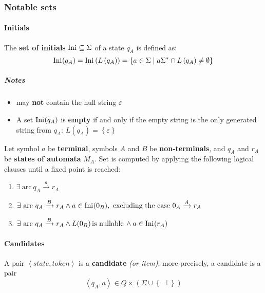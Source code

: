 \documentclass[english]{article}
\begin{document}
\subsubsection{Notable sets}

\paragraph{Initials}

\begin{definition}
  The \textbf{set of initials} \(\text{Ini}\hspace{0.1ex} \subseteq \Sigma\) of a state \(q_A\) is defined as:
  \[ \text{Ini}\hspace{0.1ex}(q_A) = \text{Ini}\hspace{0.1ex}\left( L\left( q_A \right) \right) = \left\{ a \in \Sigma \mid a \Sigma^\ast \cap L\left( q_A \right) \neq \emptyset \right\} \]
\end{definition}

\subparagraph*{Notes}

\begin{itemize}
  \item \Ini may \textbf{not} contain the null string \(\varepsilon\)
  \item A set \(\text{Ini}\hspace{0.1ex}(q_A)\) is \textbf{empty} if and only if the empty string is the only generated string from \(q_A\): \(L\left( q_A \right) = \left\{ \varepsilon \right\}\)
\end{itemize}

\bigskip
Let symbol \(a\) be \textbf{terminal}, symbols \(A\) and \(B\) be \textbf{non-terminals}, and \(q_A\) and \(r_A\) be \textbf{states of automata} \(M_A\).
Set \Ini is computed by applying the following logical clauses until a fixed point is reached:

\begin{enumerate}
  \item \(\exists \ \text{arc} \ q_A \xrightarrow{a} r_A\)
  \item \(\exists \ \text{arc} \ q_A \xrightarrow{B} r_A \land a \in \Ini(0_B), \ \text{excluding the case} \ 0_A \xrightarrow{A} r_A\)
  \item \(\exists \ \text{arc} \ q_A \xrightarrow{B} r_A \land L(0_B) \, \text{is nullable} \, \land a \in \text{Ini}\hspace{0.1ex}(r_A)\)
\end{enumerate}

\paragraph{Candidates}
\label{par:candidates}

\begin{definition}[Candidate]
  A pair \(\left\langle \textit{state}, \textit{token} \right\rangle\) is a \textbf{candidate} \textit{(or item)}:
  more precisely, a candidate is a pair
  \[ \left\langle q_A, a \right\rangle \in Q \times \left( \Sigma \cup \left\{ \dashv \right\} \right) \]
\end{definition}
\end{document}
